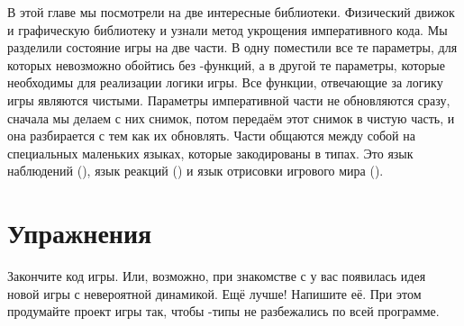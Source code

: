 В этой главе мы посмотрели на две интересные библиотеки. Физический
движок  и графическую библиотеку  и узнали метод
укрощения императивного кода. Мы разделили состояние игры на две части.
В одну поместили все те параметры, для которых невозможно обойтись без
-функций, а в другой те параметры, которые необходимы для
реализации логики игры. Все функции, отвечающие за логику игры являются
чистыми. Параметры императивной части не обновляются сразу, сначала мы
делаем с них снимок, потом передаём этот снимок в чистую часть, и она
разбирается с тем как их обновлять. Части общаются между собой на
специальных маленьких языках, которые закодированы в типах. Это язык
наблюдений (), язык реакций () и язык отрисовки
игрового мира ().

\section{Упражнения}

Закончите код игры. Или, возможно, при знакомстве с  у вас
появилась идея новой игры с невероятной динамикой. Ещё лучше! Напишите
её. При этом продумайте проект игры так, чтобы -типы не
разбежались по всей программе.
